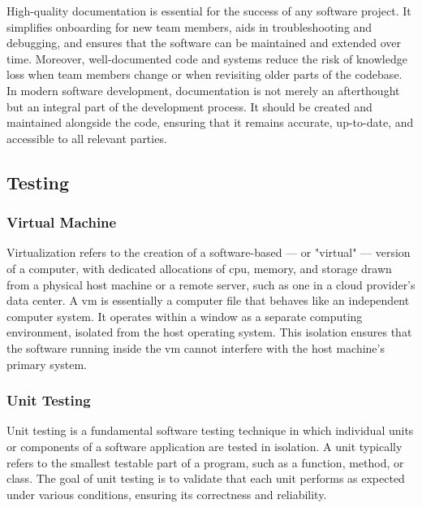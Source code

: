 High-quality documentation is essential for the success of any software project. It simplifies onboarding for new team members, aids in troubleshooting and debugging, and ensures that the software can be maintained and extended over time. Moreover, well-documented code and systems reduce the risk of knowledge loss when team members change or when revisiting older parts of the codebase. \cite{geeksforgeeks:doc} \\

In modern software development, documentation is not merely an afterthought but an integral part of the development process. It should be created and maintained alongside the code, ensuring that it remains accurate, up-to-date, and accessible to all relevant parties.

\subsection{Testing}
\label{subsec:testing}

\subsubsection*{Virtual Machine}
\label{subsubsec:virtual-machine}

Virtualization refers to the creation of a software-based — or "virtual" — version of a computer, with dedicated allocations of \gls{cpu}, memory, and storage drawn from a physical host machine or a remote server, such as one in a cloud provider's data center. A \gls{vm} is essentially a computer file that behaves like an independent computer system. It operates within a window as a separate computing environment, isolated from the host operating system. This isolation ensures that the software running inside the \gls{vm} cannot interfere with the host machine’s primary system. \cite{microsoft:virtual-machine}

\subsubsection*{Unit Testing}
\label{subsubsec:unit-testing}

Unit testing is a fundamental software testing technique in which individual units or components of a software application are tested in isolation. A unit typically refers to the smallest testable part of a program, such as a function, method, or class. The goal of unit testing is to validate that each unit performs as expected under various conditions, ensuring its correctness and reliability. \cite{geeksforgeeks:unit-test} \\

